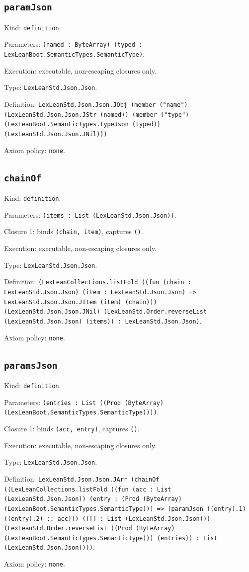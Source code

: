 \documentclass[11pt]{article}
\begin{document}
\subsection*{\texttt{paramJson}}
\noindent Kind: \texttt{definition}.\par
\noindent Parameters: \texttt{(named : ByteArray) (typed : LexLeanBoot.SemanticTypes.SemanticType)}.\par
\noindent Execution: executable, non-escaping closures only.\par
\noindent Type: \texttt{LexLeanStd.Json.Json}.\par
\noindent Definition: \texttt{LexLeanStd.Json.Json.JObj (member ("name") (LexLeanStd.Json.Json.JStr (named)) (member ("type") (LexLeanBoot.SemanticTypes.typeJson (typed)) (LexLeanStd.Json.Json.JNil)))}.\par
\noindent Axiom policy: \texttt{none}.\par
\subsection*{\texttt{chainOf}}
\noindent Kind: \texttt{definition}.\par
\noindent Parameters: \texttt{(items : List (LexLeanStd.Json.Json))}.\par
\noindent Closure 1: binds \texttt{(chain, item)}, captures \texttt{()}.\par
\noindent Execution: executable, non-escaping closures only.\par
\noindent Type: \texttt{LexLeanStd.Json.Json}.\par
\noindent Definition: \texttt{(LexLeanCollections.listFold ((fun (chain : LexLeanStd.Json.Json) (item : LexLeanStd.Json.Json) => LexLeanStd.Json.Json.JItem (item) (chain))) (LexLeanStd.Json.Json.JNil) (LexLeanStd.Order.reverseList (LexLeanStd.Json.Json) (items)) : LexLeanStd.Json.Json)}.\par
\noindent Axiom policy: \texttt{none}.\par
\subsection*{\texttt{paramsJson}}
\noindent Kind: \texttt{definition}.\par
\noindent Parameters: \texttt{(entries : List ((Prod (ByteArray) (LexLeanBoot.SemanticTypes.SemanticType))))}.\par
\noindent Closure 1: binds \texttt{(acc, entry)}, captures \texttt{()}.\par
\noindent Execution: executable, non-escaping closures only.\par
\noindent Type: \texttt{LexLeanStd.Json.Json}.\par
\noindent Definition: \texttt{LexLeanStd.Json.Json.JArr (chainOf ((LexLeanCollections.listFold ((fun (acc : List (LexLeanStd.Json.Json)) (entry : (Prod (ByteArray) (LexLeanBoot.SemanticTypes.SemanticType))) => (paramJson ((entry).1) ((entry).2) :: acc))) (([] : List (LexLeanStd.Json.Json))) (LexLeanStd.Order.reverseList ((Prod (ByteArray) (LexLeanBoot.SemanticTypes.SemanticType))) (entries)) : List (LexLeanStd.Json.Json))))}.\par
\noindent Axiom policy: \texttt{none}.\par
\end{document}
